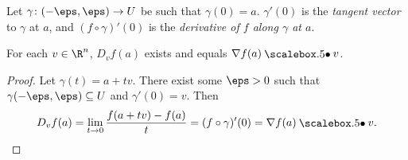 \begin{definition}
    Let $\gamma\colon (-\eps, \eps) \to U$ be such that $\gamma(0) = a$.
    $\gamma'(0)$ is the \emph{tangent vector} to $\gamma$ at $a$,
    and $(f \circ \gamma)'(0)$ is the
    \emph{derivative of $f$ along $\gamma$ at $a$}.
\end{definition}

\begin{proposition}
    For each $v \in \R^n$, $D_v f(a)$ exists and equals
    $\grad f(a) \dotp v$.
\end{proposition}
\begin{proof}
    Let $\gamma(t) = a + tv$.
    There exist some $\eps > 0$ such that $\gamma(-\eps, \eps) \subseteq U$
    and $\gamma'(0) = v$.
    Then \[
        D_v f(a) = \lim_{t \to 0} \frac{f(a + tv) - f(a)}{t}
        = (f \circ \gamma)'(0) = \grad f(a) \dotp v. \qedhere
    \]
\end{proof}
